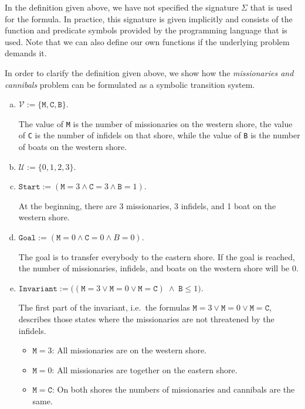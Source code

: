 \remarkEng
In the definition given above, we have not specified the signature $\Sigma$ that is used for the formula.
In practice, this signature is given implicitly and consists of the function and predicate symbols provided by
the programming language that is used.  Note that we can also define our own functions if the underlying
problem demands it.
\eox

\exampleEng
In order to clarify the definition given above, we show how the \emph{missionaries and
  cannibals} problem can be formulated as 
a symbolic transition system.
\begin{enumerate}[(a)]
\item $\mathcal{V} := \{ \mathtt{M}, \mathtt{C}, \mathtt{B} \}$.

      The value of \texttt{M} is the number of missionaries on the western shore, the value of \texttt{C} is
      the number of infidels on that shore, while the value of \texttt{B} is the number of boats on the western
      shore.
\item $\mathcal{U} := \{ 0, 1, 2, 3 \}$.
\item $\texttt{Start} := (\mathtt{M} = 3 \wedge \mathtt{C} = 3 \wedge \mathtt{B} = 1)$.

      At the beginning, there are 3 missionaries, 3 infidels, and 1 boat on the western shore.
\item $\texttt{Goal}  := (\mathtt{M} = 0 \wedge \mathtt{C} = 0 \wedge B = 0)$.

      The goal is to transfer everybody to the eastern shore.  If the goal is reached, the number of
      missionaries, infidels, and boats on the western shore will be $0$.
\item $\texttt{Invariant} := \bigl((\mathtt{M} = 3 \vee \mathtt{M} = 0 \vee \mathtt{M} = \mathtt{C}) \;\wedge\; \mathtt{B} \leq 1\bigr)$.

      The first part of the invariant, i.e.~the formulas $\mathtt{M} = 3 \vee \mathtt{M} = 0 \vee \mathtt{M} = \mathtt{C}$,
      describes those states where the missionaries are not threatened by the infidels.
      \begin{itemize}
      \item $\mathtt{M} = 3$: All missionaries are on the western shore.
      \item $\mathtt{M} = 0$: All missionaries are together on the eastern shore.
      \item $\mathtt{M} = \mathtt{C}$: On both shores the numbers of missionaries and cannibals are the same.


\end{itemize}
\end{enumerate}
